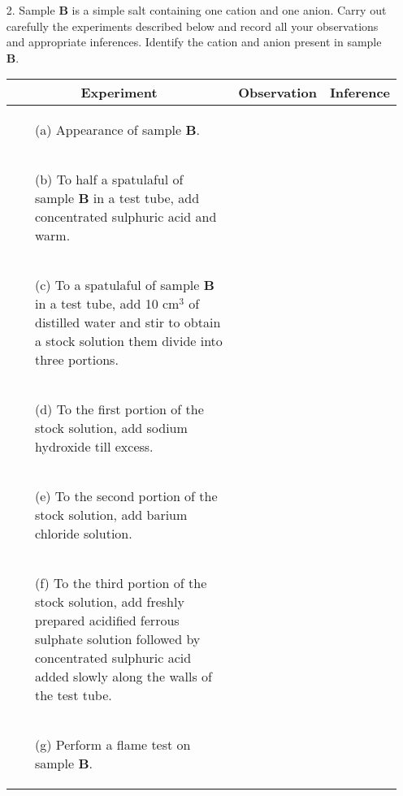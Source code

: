 \begin{enumerate}
\item[2.] Sample \textbf{B} is a simple salt containing one cation and one anion. Carry out carefully the experiments described below and record all your observations and appropriate inferences. Identify the cation and anion present in sample \textbf{B}.\\
\begin{center}
\begin{tabular}{|p{8cm}|c|c|}
\hline
\multicolumn{1}{|c|}{\textbf{Experiment}}&\textbf{Observation}&\textbf{Inference}\\ \hline
\begin{enumerate}
\item[(a)] Appearance of sample \textbf{B}.
\end{enumerate}
&&\\ \hline
\begin{enumerate}
\item[(b)] To half a spatulaful of sample \textbf{B} in a test tube, add concentrated sulphuric acid and warm.
\end{enumerate}
&&\\ \hline
\begin{enumerate}
\item[(c)] To a spatulaful of sample \textbf{B} in a test tube, add 10 cm$^3$ of distilled water and stir to obtain a stock solution them divide into three portions.
\end{enumerate}
&&\\ \hline
\begin{enumerate}
\item[(d)] To the first portion of the stock solution, add sodium hydroxide till excess.
\end{enumerate}
&&\\ \hline
\begin{enumerate}
\item[(e)] To the second portion of the stock solution, add barium chloride solution.
\end{enumerate}
&&\\ \hline
\begin{enumerate}
\item[(f)] To the third portion of the stock solution, add freshly prepared acidified ferrous sulphate solution followed by concentrated sulphuric acid added slowly along the walls of the test tube.
\end{enumerate}
&&\\ \hline
\begin{enumerate}
\item[(g)] Perform a flame test on sample \textbf{B}.
\end{enumerate}
&&\\ \hline
\end{tabular}\\


\end{center}
\end{enumerate}
